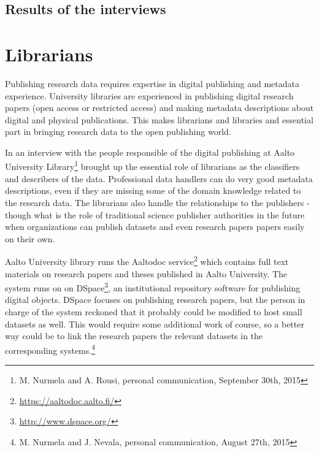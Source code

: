 \subsection{Results of the interviews}

\fi

\section{Librarians}

Publishing research data requires expertise in digital publishing and metadata
experience. University libraries are experienced in publishing digital research
papers (open access or restricted access) and making metadata descriptions
about digital and physical publications. This makes librarians and libraries
and essential part in bringing research data to the open publishing world.

In an interview with the people responsible of the digital publishing at Aalto
University Library\footnote{M. Nurmela and A. Rousi, personal
communication, September 30th, 2015} brought up the essential role of
librarians as the classifiers and describers of the data. Professional data
handlers can do very good metadata descriptions, even if they are missing
some of the domain knowledge related to the research data. The librarians
also handle the relationships to the publishers - though what is the role
of traditional science publisher authorities in the future when organizations
can publish datasets and even research papers papers easily on their own.

Aalto University library runs the Aaltodoc service\footnote{\url{https://aaltodoc.aalto.fi/}}
which contains full text materials on research papers and theses published
in Aalto University. The system runs on on DSpace\footnote{\url{http://www.dspace.org/}},
an institutional repository software for publishing digital objects. DSpace
focuses on publishing research papers, but the person in charge of the system
reckoned that it probably could be modified to host small datasets as well.
This would require some additional work of course, so a better way could be to
link the research papers the relevant datasets in the corresponding systems.\footnote{M.
Nurmela and J. Nevala, personal communication, August 27th, 2015}

